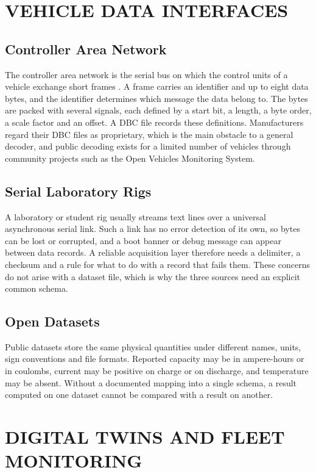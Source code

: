 \documentclass[12pt,a4paper]{amritareport}
\begin{document}
\section{VEHICLE DATA INTERFACES}

\subsection{Controller Area Network}

The controller area network is the serial bus on which the control units of a vehicle exchange short frames \cite{iso11898}. A frame carries an identifier and up to eight data bytes, and the identifier determines which message the data belong to. The bytes are packed with several signals, each defined by a start bit, a length, a byte order, a scale factor and an offset. A DBC file records these definitions. Manufacturers regard their DBC files as proprietary, which is the main obstacle to a general decoder, and public decoding exists for a limited number of vehicles through community projects such as the Open Vehicles Monitoring System.

\subsection{Serial Laboratory Rigs}

A laboratory or student rig usually streams text lines over a universal asynchronous serial link. Such a link has no error detection of its own, so bytes can be lost or corrupted, and a boot banner or debug message can appear between data records. A reliable acquisition layer therefore needs a delimiter, a checksum and a rule for what to do with a record that fails them. These concerns do not arise with a dataset file, which is why the three sources need an explicit common schema.

\subsection{Open Datasets}

Public datasets store the same physical quantities under different names, units, sign conventions and file formats. Reported capacity may be in ampere-hours or in coulombs, current may be positive on charge or on discharge, and temperature may be absent. Without a documented mapping into a single schema, a result computed on one dataset cannot be compared with a result on another.

\section{DIGITAL TWINS AND FLEET MONITORING}
\end{document}
